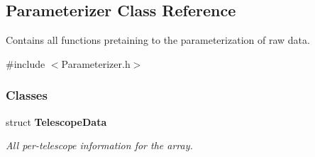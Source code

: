 \hypertarget{classParameterizer}{
\subsection{Parameterizer Class Reference}
\label{classParameterizer}
}


Contains all functions pretaining to the parameterization of raw data.  




{\ttfamily \#include $<$Parameterizer.h$>$}

\subsubsection*{Classes}
\begin{DoxyCompactItemize}
\item 
struct {\bfseries TelescopeData}
\begin{DoxyCompactList}\small\item\em All per-\/telescope information for the array. \end{DoxyCompactList}\end{DoxyCompactItemize}
